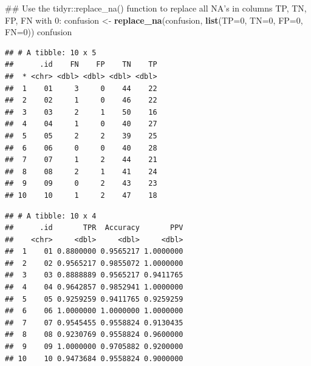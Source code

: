 \documentclass[]{article}
\newenvironment{Shaded}{\begin{snugshade}}{\end{snugshade}}
\newcommand{\KeywordTok}[1]{\textcolor[rgb]{0.13,0.29,0.53}{\textbf{#1}}}
\newcommand{\DataTypeTok}[1]{\textcolor[rgb]{0.13,0.29,0.53}{#1}}
\newcommand{\DecValTok}[1]{\textcolor[rgb]{0.00,0.00,0.81}{#1}}
\newcommand{\StringTok}[1]{\textcolor[rgb]{0.31,0.60,0.02}{#1}}
\newcommand{\OperatorTok}[1]{\textcolor[rgb]{0.81,0.36,0.00}{\textbf{#1}}}
\newcommand{\NormalTok}[1]{#1}
\begin{document}
\begin{Shaded}
\begin{Highlighting}[]
\NormalTok{## Use the tidyr::replace_na() function to replace all NA's in columns TP, TN, FP, FN with 0:}
\NormalTok{confusion <-}\StringTok{ }\KeywordTok{replace_na}\NormalTok{(confusion, }\KeywordTok{list}\NormalTok{(}\DataTypeTok{TP=}\DecValTok{0}\NormalTok{, }\DataTypeTok{TN=}\DecValTok{0}\NormalTok{, }\DataTypeTok{FP=}\DecValTok{0}\NormalTok{, }\DataTypeTok{FN=}\DecValTok{0}\NormalTok{))}
\NormalTok{confusion}
\end{Highlighting}
\end{Shaded}

\begin{verbatim}
## # A tibble: 10 x 5
##      .id    FN    FP    TN    TP
##  * <chr> <dbl> <dbl> <dbl> <dbl>
##  1    01     3     0    44    22
##  2    02     1     0    46    22
##  3    03     2     1    50    16
##  4    04     1     0    40    27
##  5    05     2     2    39    25
##  6    06     0     0    40    28
##  7    07     1     2    44    21
##  8    08     2     1    41    24
##  9    09     0     2    43    23
## 10    10     1     2    47    18
\end{verbatim}

\begin{Shaded}
\end{Shaded}

\begin{verbatim}
## # A tibble: 10 x 4
##      .id       TPR  Accuracy       PPV
##    <chr>     <dbl>     <dbl>     <dbl>
##  1    01 0.8800000 0.9565217 1.0000000
##  2    02 0.9565217 0.9855072 1.0000000
##  3    03 0.8888889 0.9565217 0.9411765
##  4    04 0.9642857 0.9852941 1.0000000
##  5    05 0.9259259 0.9411765 0.9259259
##  6    06 1.0000000 1.0000000 1.0000000
##  7    07 0.9545455 0.9558824 0.9130435
##  8    08 0.9230769 0.9558824 0.9600000
##  9    09 1.0000000 0.9705882 0.9200000
## 10    10 0.9473684 0.9558824 0.9000000
\end{verbatim}
\end{document}
